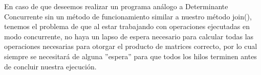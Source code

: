 \begin{enumerate}
    En caso de que deseemos realizar un programa análogo a Determinante Concurrente sin un método de funcionamiento similar a nuestro método join(), tenemos el problema de que al estar trabajando con operaciones ejecutadas en modo concurrente, no haya un lapso de espera necesario para calcular todas las operaciones necesarias para otorgar el producto de matrices correcto, por lo cual siempre se necesitará de alguna ''espera'' para que todos los hilos terminen antes de concluir nuestra ejecución.

    \hfill
    
\end{enumerate}
